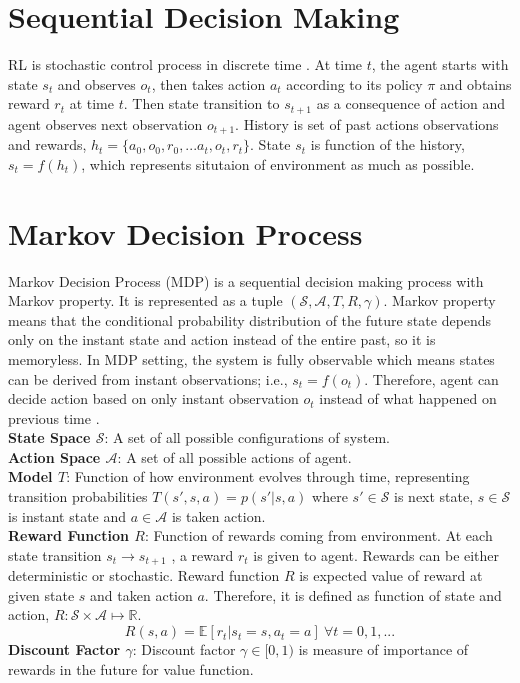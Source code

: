 \section{Sequential Decision Making}
RL is stochastic control process in discrete time \cite{sutton_reinforcement_1998}. At time $t$, the agent starts with state $s_t$ and observes $o_t$, then takes action $a_t$ according to its policy $\pi$ and obtains reward $r_t$ at time $t$. Then state transition to $s_{t+1}$ as a consequence of action and agent observes next observation $o_{t+1}$. History is set of past actions observations and rewards, $h_t=\{ a_0, o_0, r_0, ... a_t, o_t, r_t\}$. State $s_t$ is function of the history, $s_t=f(h_t)$, which represents situtaion of environment as much as possible. \\
\section{Markov Decision Process}
\label{sec:mdp}
Markov Decision Process (MDP) is a sequential decision making process with Markov property. It is represented as a tuple $(\mathcal{S},\mathcal{A},T,R,\gamma)$. Markov property means that the conditional probability distribution of the future state depends only on the instant state and action instead of the entire past, so it is memoryless. In MDP setting, the system is fully observable which means states can be derived from instant observations; i.e., $s_t=f(o_t)$. Therefore, agent can decide action based on only instant observation $o_t$ instead of what happened on previous time \cite{francois-lavet_introduction_2018}. \\
\textbf{State Space $\mathcal{S}$}: A set of all possible configurations of system. \\
\textbf{Action Space $\mathcal{A}$}: A set of all possible actions of agent. \\
\textbf{Model $T$}: Function of how environment evolves through time, representing transition probabilities $T(s',s,a) = p(s'|s,a)$ where $s' \in \mathcal{S}$ is next state, $s \in \mathcal{S}$ is instant state and $a \in \mathcal{A}$ is taken action. \\
\textbf{Reward Function $R$}: Function of rewards coming from environment. At each state transition $s_t \rightarrow s_{t+1}$ , a reward $r_t$ is given to agent. Rewards can be either deterministic or stochastic. Reward function $R$ is expected value of reward at given state $s$ and taken action $a$. Therefore, it is defined as function of state and action, $R \colon \mathcal{S} \times \mathcal{A} \mapsto \mathbb{R}$. \\
\begin{equation}
R(s,a) = \mathbb{E}[r_t|s_t=s, a_t=a] \: \forall t = 0,1, ...
\end{equation}
\textbf{Discount Factor $\gamma$}: Discount factor $\gamma \in [0,1)$ is measure of importance of rewards in the future for value function. \\

